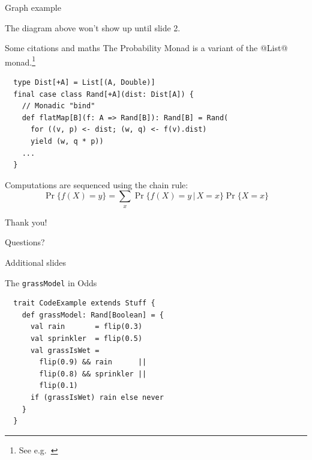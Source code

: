 \documentclass[xcolor={usenames,dvipsnames}]{beamer}
\renewcommand{\emph}[1]{\alert{#1}}
\begin{document}
\begin{frame}[fragile,t]{Graph example}
{\begin{center}
  \end{center}}
  The diagram above won't show up until slide 2.
\end{frame}
\fi

\begin{frame}[fragile]{Some citations and maths}
  The \emph{Probability Monad} is a variant of the @List@
  monad.\footnote{See e.g.\ \cite{RamseyP2002popl,Gibbons2012utp}}

  \begin{lstlisting}
  type Dist[+A] = List[(A, Double)]
  final case class Rand[+A](dist: Dist[A]) {
    // Monadic "bind"
    def flatMap[B](f: A => Rand[B]): Rand[B] = Rand(
      for ((v, p) <- dist; (w, q) <- f(v).dist)
      yield (w, q * p))
    ...
  }
  \end{lstlisting}
  Computations are sequenced using the \emph{chain rule}:
  \[
  \Pr\{ f(X) = y \} = \sum_{x} \Pr\{ f(X) = y \,|\, X = x \} \Pr\{ X =
  x \}
  \]
\end{frame}

\begin{frame}{Thank you!}
  \begin{center}
    \Huge Questions?
  \end{center}
\end{frame}


\appendix
{}
\setcounter{finalframe}{\value{framenumber}}

\begin{frame}[noframenumbering]
  \begin{center}
    \emph{\LARGE Additional slides}
  \end{center}
\end{frame}

\begin{frame}[fragile]{The \texttt{grassModel} in Odds}
  \setcounter{framenumber}{\value{finalframe}}%
  \begin{lstlisting}
  trait CodeExample extends Stuff {
    def grassModel: Rand[Boolean] = {
      val rain       = flip(0.3)
      val sprinkler  = flip(0.5)
      val grassIsWet =
        flip(0.9) && rain      ||
        flip(0.8) && sprinkler ||
        flip(0.1)
      if (grassIsWet) rain else never
    }
  }
  \end{lstlisting}
\end{frame}
\end{document}
